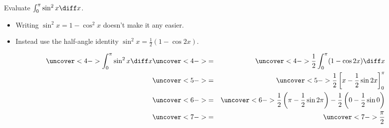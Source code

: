 \begin{frame}
\begin{example} %
Evaluate $\int_0^{\pi} \sin^2 x \diff x$.
\begin{itemize}
\item<2->  Writing $\sin^2 x = 1 - \cos^2 x$ doesn't make it any easier.
\item<3->  Instead use the half-angle identity $\sin^2 x = \frac{1}{2}(1-\cos 2x)$.
\end{itemize}
\abovedisplayskip=0pt
\belowdisplayskip=0pt
\begin{eqnarray*}
\uncover<4->{%
\int_0^{\pi} \sin^2 x \diff x 
}%
& \uncover<4->{ = } &%
\uncover<4->{%
\frac{1}{2}\int_0^{\pi} (1-\cos 2x)\diff x
}\\%
& \uncover<5->{ = } &%
\uncover<5->{%
\frac{1}{2}\left[ x - \frac{1}{2}\sin 2x\right]_0^{\pi}
}\\%
& \uncover<6->{ = } &%
\uncover<6->{%
\frac{1}{2}\left( \pi - \frac{1}{2}\sin 2\pi\right) %
 - \frac{1}{2}\left( 0 - \frac{1}{2}\sin 0\right)
}\\%
& \uncover<7->{ = } &%
\uncover<7->{%
\frac{\pi}{2}
}\\%
\end{eqnarray*}
\end{example}
\end{frame}
